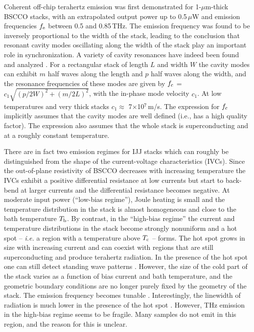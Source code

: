 \documentclass[aps,twocolumn,prb,showpacs,preprintnumbers,superscriptaddress,amsmath,amssymb,longbibliography]{revtex4-1}
\newcommand{\ie}{{\it i.e. }}
\begin{document}
Coherent off-chip terahertz emission was first demonstrated for 1-$\mu$m-thick BSCCO stacks, with an extrapolated output power up to 0.5\,$\mu$W and emission frequencies $f_{\rm e}$ between 0.5 and 0.85\,THz\cite{Ozyuzer07}. The emission frequency was found to be inversely proportional to the width of the stack, leading to the conclusion that resonant cavity modes oscillating along the width of the stack play an important role in synchronization. A variety of cavity resonances have indeed been found and analyzed \cite{Kadowaki08,Lin08,Minami09,Wang09a,Kadowaki10,Wang10a,Guenon10,Koshelev10,Yamaki11,Klemm11,Tsujimoto10,Liu13,Watanabe14,Tsujimoto16,Cerkoney17,Klemm17,Klemm17b,Kashiwagi18}. For a rectangular stack of length $L$ and width $W$ the cavity modes can exhibit $m$ half waves along the length and $p$ half waves along the width, and the resonance frequencies of these modes are given by $f_{\rm c}$ = $c_1\sqrt{(p/2W)^2+(m/2L)^2}$, with the in-phase mode velocity $c_1$. At low temperatures and very thick stacks $c_1 \approx$ 7$\times$10$^7$\,m/s. The expression for $f_{\rm c}$ implicitly assumes that the cavity modes are well defined (i.e., has a high quality factor). The expression also assumes that the whole stack is superconducting and at a roughly constant temperature. 

There are in fact two emission regimes for IJJ stacks which can roughly be distinguished from the shape of the current-voltage characteristics (IVCs). Since the out-of-plane resistivity of BSCCO decreases with increasing temperature the IVCs exhibit a positive differential resistance at low currents but start to back-bend at larger currents and the differential resistance becomes negative. At moderate input power (``low-bias regime''), Joule heating is small and the temperature distribution in the stack is almost homogeneous and close to the bath temperature $T_{\rm b}$.
By contrast, in the ``high-bias regime'' the current and temperature distributions in the stack become strongly nonuniform and a hot spot -- \ie a region with a temperature above $T_{\rm c}$ -- forms\cite{Wang09a,Wang10a,Guenon10,Yurgens11,Gross12,Kakeya12,Benseman13,Minami14,Zhou15a,Watanabe15}. The hot spot grows in size with increasing current and can coexist with regions that are still superconducting and produce terahertz radiation. In the presence of the hot spot one can still detect standing wave patterns \cite{Wang09a, Wang10a, Guenon10}. However, the size of the cold part of the stack varies as a function of bias current and bath temperature, and the geometric boundary conditions are no longer purely fixed by the geometry of the stack. The emission frequency becomes tunable \cite{Zhou15a,Zhou15b, Watanabe15}. Interestingly, the linewidth of radiation is much lower in the presence of the hot spot \cite{Li12}. However, THz emission in the high-bias regime seems to be fragile. Many samples do not emit in this region, and the reason for this is unclear.
\end{document}
